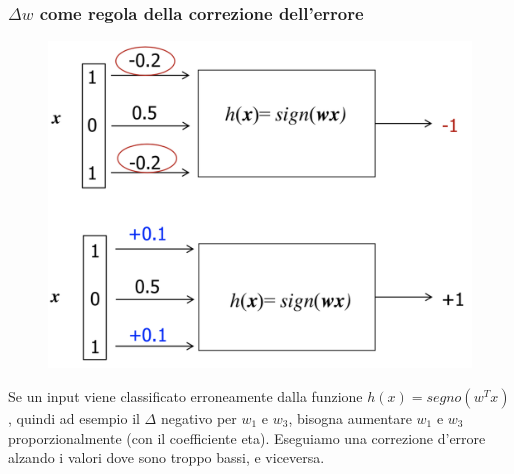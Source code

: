 \documentclass{article}
\begin{document}
\subsubsection{$\Delta w$ come regola della correzione dell'errore}
\begin{figure}[H]
\centering
\includegraphics[scale=0.4]{Images/errorcorrection.png}
\end{figure}
Se un input viene classificato erroneamente dalla funzione $h(x)=segno(w^Tx)$, quindi ad esempio il $\Delta$ negativo per $w_1$ e $w_3$, bisogna aumentare $w_1$ e $w_3$ proporzionalmente (con il coefficiente eta). Eseguiamo una correzione d'errore alzando i valori dove sono troppo bassi, e viceversa.
\end{document}
